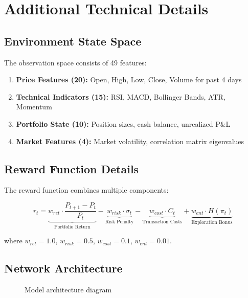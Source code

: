 \documentclass[10pt]{IEEEtran}
\begin{document}
\section{Additional Technical Details}

\subsection{Environment State Space}
The observation space consists of 49 features:

\begin{enumerate}
\item \textbf{Price Features (20):} Open, High, Low, Close, Volume for past 4 days
\item \textbf{Technical Indicators (15):} RSI, MACD, Bollinger Bands, ATR, Momentum
\item \textbf{Portfolio State (10):} Position sizes, cash balance, unrealized P\&L
\item \textbf{Market Features (4):} Market volatility, correlation matrix eigenvalues
\end{enumerate}

\subsection{Reward Function Details}
The reward function combines multiple components:

\begin{equation}
r_t = \underbrace{w_{ret} \cdot \frac{P_{t+1} - P_t}{P_t}}_{\text{Portfolio Return}} - \underbrace{w_{risk} \cdot \sigma_t}_{\text{Risk Penalty}} - \underbrace{w_{cost} \cdot C_t}_{\text{Transaction Costs}} + \underbrace{w_{ent} \cdot H(\pi_t)}_{\text{Exploration Bonus}}
\end{equation}

where $w_{ret} = 1.0$, $w_{risk} = 0.5$, $w_{cost} = 0.1$, $w_{ent} = 0.01$.

\subsection{Network Architecture}
\begin{figure}[h]
\centering
{}
\caption{Model architecture diagram}
\end{figure}
\end{document}
